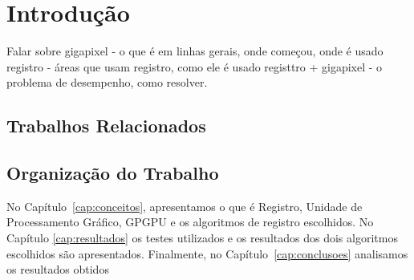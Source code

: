 \chapter{Introdução}
\label{cap:introducao}

	



Falar sobre
gigapixel - o que é em linhas gerais, onde começou, onde é usado
registro - áreas que usam registro, como ele é usado
registtro + gigapixel - o problema de desempenho, como resolver.


\section{Trabalhos Relacionados}
\label{sec:objetivo}

\section{Organização do Trabalho}
\label{sec:organizacao_trabalho}

No Capítulo~\ref{cap:conceitos}, apresentamos o que é Registro, Unidade de Processamento Gráfico, GPGPU e os algoritmos 
de registro escolhidos. No Capítulo \ref{cap:resultados} os testes utilizados e os resultados dos dois algoritmos 
escolhidos são apresentados. Finalmente, no Capítulo~\ref{cap:conclusoes} analisamos os resultados obtidos 